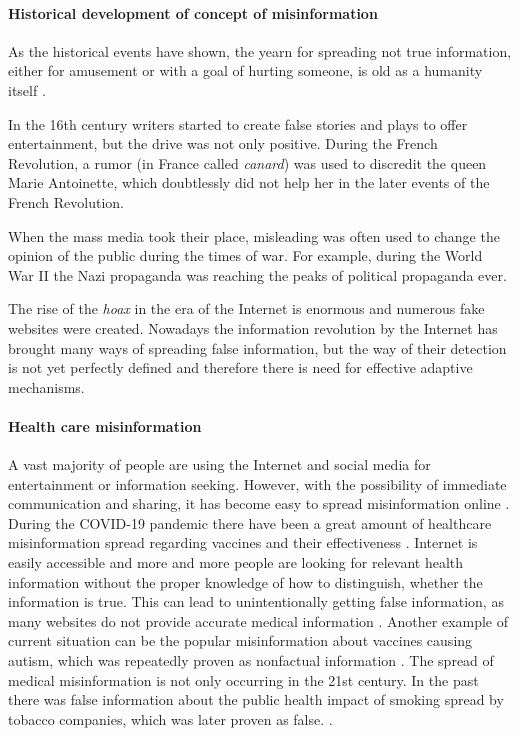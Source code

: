 \documentclass[11pt ,english,a4paper]{article}
\begin{document}
\paragraph{Historical development of concept of misinformation}%
As the historical events have shown, the yearn for spreading not true information, either for amusement or with a goal of hurting someone, is old as a humanity itself \cite{bur17history}.

In the 16th century writers started to create false stories and plays to offer entertainment, but the drive was not only positive. During the French Revolution, a rumor (in France called \emph{canard}) was used to discredit the queen Marie Antoinette, which doubtlessly did not help her in the later events of the French Revolution. \cite{bur17history} 

When the mass media took their place, misleading was often used to change the opinion of the public during the times of war. For example, during the World War II the Nazi propaganda was reaching the peaks of political propaganda ever. \cite{pos18short}

The rise of the \emph{hoax} in the era of the Internet is enormous and numerous fake websites were created.\cite{bur17history} Nowadays the information revolution by the Internet has brought many ways of spreading false information, but the way of their detection is not yet perfectly defined and therefore there is need for effective adaptive mechanisms.

\paragraph{Health care misinformation}
A vast majority of people are using the Internet and social media for entertainment or information seeking. However, with the possibility of immediate communication and sharing, it has become easy to spread misinformation online \cite{wa19sys}. During the COVID-19 pandemic there have been a great amount of healthcare misinformation spread regarding vaccines and their effectiveness \cite{chap22unmask}. Internet is easily accessible and more and more people are looking for relevant health information without the proper knowledge of how to distinguish, whether the information is true. This can lead to unintentionally getting false information, as many websites do not provide accurate medical information \cite{cook15misinfo}. Another example of current situation can be the popular misinformation about vaccines causing autism, which was repeatedly proven as nonfactual information \cite{wa19sys}. 
The spread of medical misinformation is not only occurring in the 21st century. In the past there was false information about the public health impact of smoking spread by tobacco companies, which was later proven as false. \cite{cook15misinfo}.
\end{document}
